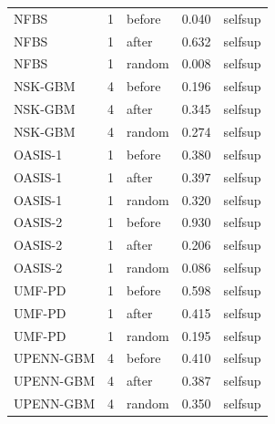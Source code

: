 \begin{tabular}{lrlrl}
NFBS & 1 & before & 0.040 & selfsup \\
NFBS & 1 & after & 0.632 & selfsup \\
NFBS & 1 & random & 0.008 & selfsup \\
NSK-GBM & 4 & before & 0.196 & selfsup \\
NSK-GBM & 4 & after & 0.345 & selfsup \\
NSK-GBM & 4 & random & 0.274 & selfsup \\
OASIS-1 & 1 & before & 0.380 & selfsup \\
OASIS-1 & 1 & after & 0.397 & selfsup \\
OASIS-1 & 1 & random & 0.320 & selfsup \\
OASIS-2 & 1 & before & 0.930 & selfsup \\
OASIS-2 & 1 & after & 0.206 & selfsup \\
OASIS-2 & 1 & random & 0.086 & selfsup \\
UMF-PD & 1 & before & 0.598 & selfsup \\
UMF-PD & 1 & after & 0.415 & selfsup \\
UMF-PD & 1 & random & 0.195 & selfsup \\
UPENN-GBM & 4 & before & 0.410 & selfsup \\
UPENN-GBM & 4 & after & 0.387 & selfsup \\
UPENN-GBM & 4 & random & 0.350 & selfsup \\
\bottomrule
\end{tabular}
